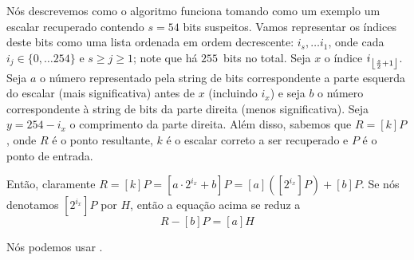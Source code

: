 Nós descrevemos como o algoritmo funciona tomando como um exemplo um escalar recuperado contendo $s=54$ bits suspeitos. Vamos representar os índices deste bits como uma lista ordenada em ordem decrescente: $i_s, \dots i_1$,
onde cada $i_j \in \{0, \dots 254\}$ e $s \ge j \ge 1$; note que há $255$~bits no total. Seja $x$ o índice $i_{\floor*{\frac{s}{2} + 1}}$.
Seja $a$ o número representado pela string de bits correspondente a parte esquerda do escalar (mais significativa) antes de $x$ (incluindo $i_x$) e seja $b$ o número correspondente à string de bits da parte direita (menos significativa).
Seja $y=254-i_x$ o comprimento da parte direita. Além disso, sabemos que $R = [k] P$,
onde $R$ é o ponto resultante, $k$ é o escalar correto a ser recuperado e $P$ é o ponto de entrada.


Então, claramente $R = [k] P = [a \cdot 2^{i_x} + b] P = [a] ([2^{i_x}] P) + [b] P$. 
Se nós denotamos $[2^{i_x}] P$ por $H$, então a equação acima se reduz a
\begin{equation}\label{eq:check}
R - [b] P = [a] H
\end{equation}


Nós podemos usar .



